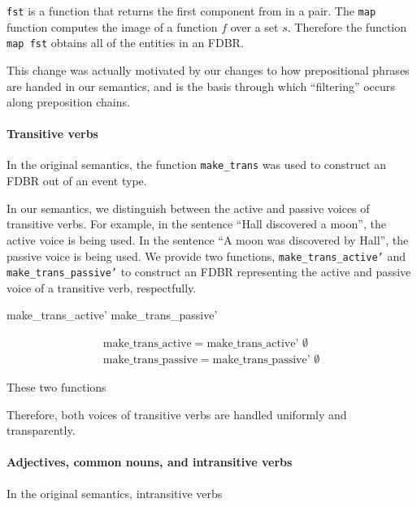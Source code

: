 \documentclass[../main.tex]{subfiles}
\begin{document}
\texttt{fst} is a function that returns the first component from in a pair.  The \texttt{map} function computes the image of a function $f$ over a set $s$.  
Therefore the function \texttt{map fst} obtains all of the entities in an FDBR.

This change was actually motivated by our changes to how prepositional phrases are handed in our semantics, and is the basis through which
``filtering'' occurs along preposition chains.

\paragraph{Transitive verbs}

In the original semantics, the function \texttt{make\_trans} was used to construct an FDBR out of an event type.

In our semantics, we distinguish between the active and passive voices of transitive verbs.  For example, in the sentence ``Hall discovered a moon'', the active voice is being used.
In the sentence ``A moon was discovered by Hall'', the passive voice is being used.  
We provide two functions, \texttt{make\_trans\_active'} and \texttt{make\_trans\_passive'} to construct an FDBR representing the active and passive voice of a transitive verb, respectfully.

\begin{code}
	make_trans_active'
	make_trans_passive'
\end{code}

\begin{equation*}
\begin{split}
\text{make\_trans\_active} = \text{make\_trans\_active' } \emptyset \\
\text{make\_trans\_passive} = \text{make\_trans\_passive' } \emptyset
\end{split}
\end{equation*}



These two functions

Therefore, both voices of transitive verbs are handled uniformly and transparently.


\paragraph{Adjectives, common nouns, and intransitive verbs}



In the original semantics, intransitive verbs
\end{document}
